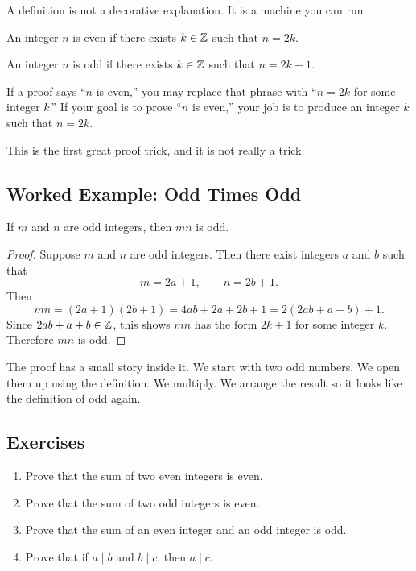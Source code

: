 \documentclass[11pt]{article}
\begin{document}
A definition is not a decorative explanation. It is a machine you can run.

\begin{definition}
An integer $n$ is even if there exists $k\in\mathbb{Z}$ such that $n=2k$.
\end{definition}

\begin{definition}
An integer $n$ is odd if there exists $k\in\mathbb{Z}$ such that $n=2k+1$.
\end{definition}

If a proof says ``$n$ is even,'' you may replace that phrase with ``$n=2k$ for some integer $k$.'' If your goal is to prove ``$n$ is even,'' your job is to produce an integer $k$ such that $n=2k$.

This is the first great proof trick, and it is not really a trick.

\subsection{Worked Example: Odd Times Odd}

\begin{theorem}
If $m$ and $n$ are odd integers, then $mn$ is odd.
\end{theorem}

\begin{proof}
Suppose $m$ and $n$ are odd integers. Then there exist integers $a$ and $b$ such that
\[
m=2a+1,\qquad n=2b+1.
\]
Then
\[
mn=(2a+1)(2b+1)=4ab+2a+2b+1=2(2ab+a+b)+1.
\]
Since $2ab+a+b\in\mathbb{Z}$, this shows $mn$ has the form $2k+1$ for some integer $k$. Therefore $mn$ is odd.
\end{proof}

The proof has a small story inside it. We start with two odd numbers. We open them up using the definition. We multiply. We arrange the result so it looks like the definition of odd again.

\subsection{Exercises}

\begin{enumerate}
\item Prove that the sum of two even integers is even.
\item Prove that the sum of two odd integers is even.
\item Prove that the sum of an even integer and an odd integer is odd.
\item Prove that if $a\mid b$ and $b\mid c$, then $a\mid c$.
\end{enumerate}
\end{document}
